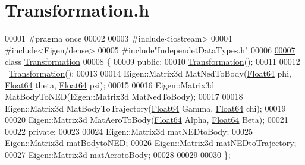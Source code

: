 \hypertarget{_transformation_8h_source}{}\section{Transformation.\+h}
\label{_transformation_8h_source}

\begin{DoxyCode}
00001 \textcolor{preprocessor}{#pragma once}
00002 
00003 \textcolor{preprocessor}{#include<iostream>}
00004 \textcolor{preprocessor}{#include<Eigen/dense>}
00005 \textcolor{preprocessor}{#include"IndependetDataTypes.h"}
00006 
\hyperlink{class_transformation}{00007} \textcolor{keyword}{class }\hyperlink{class_transformation}{Transformation}
00008 \{
00009 \textcolor{keyword}{public}:
00010     \hyperlink{class_transformation}{Transformation}();
00011 
00012     ~\hyperlink{class_transformation}{Transformation}();
00013 
00014     Eigen::Matrix3d MatNedToBody(\hyperlink{group___tools_ga3f1431cb9f76da10f59246d1d743dc2c}{Float64} phi, \hyperlink{group___tools_ga3f1431cb9f76da10f59246d1d743dc2c}{Float64} theta, 
      \hyperlink{group___tools_ga3f1431cb9f76da10f59246d1d743dc2c}{Float64} psi);
00015 
00016     Eigen::Matrix3d MatBodyToNED(Eigen::Matrix3d MatNedToBody);
00017 
00018     Eigen::Matrix3d MatBodyToTrajectory(\hyperlink{group___tools_ga3f1431cb9f76da10f59246d1d743dc2c}{Float64} Gamma, \hyperlink{group___tools_ga3f1431cb9f76da10f59246d1d743dc2c}{Float64} chi);
00019 
00020     Eigen::Matrix3d MatAeroToBody(\hyperlink{group___tools_ga3f1431cb9f76da10f59246d1d743dc2c}{Float64} Alpha, \hyperlink{group___tools_ga3f1431cb9f76da10f59246d1d743dc2c}{Float64} Beta);
00021 
00022 \textcolor{keyword}{private}:
00023 
00024     Eigen::Matrix3d matNEDtoBody;
00025     Eigen::Matrix3d matBodytoNED;
00026     Eigen::Matrix3d matNEDtoTrajectory;
00027     Eigen::Matrix3d matAerotoBody;
00028 
00029 
00030 \};
\end{DoxyCode}
